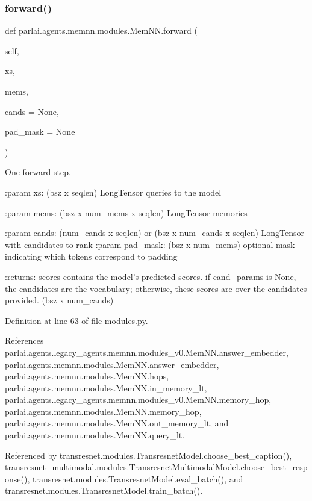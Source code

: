 \subsubsection{\texorpdfstring{forward()}{forward()}}
{\footnotesize\ttfamily def parlai.\+agents.\+memnn.\+modules.\+Mem\+N\+N.\+forward (\begin{DoxyParamCaption}\item[{}]{self,  }\item[{}]{xs,  }\item[{}]{mems,  }\item[{}]{cands = {\ttfamily None},  }\item[{}]{pad\+\_\+mask = {\ttfamily None} }\end{DoxyParamCaption})}

\begin{DoxyVerb}One forward step.

:param xs:
    (bsz x seqlen) LongTensor queries to the model

:param mems:
    (bsz x num_mems x seqlen) LongTensor memories

:param cands:
    (num_cands x seqlen) or (bsz x num_cands x seqlen)
    LongTensor with candidates to rank
:param pad_mask:
    (bsz x num_mems) optional mask indicating which tokens
    correspond to padding

:returns:
    scores contains the model's predicted scores.
    if cand_params is None, the candidates are the vocabulary;
    otherwise, these scores are over the candidates provided.
    (bsz x num_cands)
\end{DoxyVerb}
 

Definition at line 63 of file modules.\+py.



References parlai.\+agents.\+legacy\+\_\+agents.\+memnn.\+modules\+\_\+v0.\+Mem\+N\+N.\+answer\+\_\+embedder, parlai.\+agents.\+memnn.\+modules.\+Mem\+N\+N.\+answer\+\_\+embedder, parlai.\+agents.\+memnn.\+modules.\+Mem\+N\+N.\+hops, parlai.\+agents.\+memnn.\+modules.\+Mem\+N\+N.\+in\+\_\+memory\+\_\+lt, parlai.\+agents.\+legacy\+\_\+agents.\+memnn.\+modules\+\_\+v0.\+Mem\+N\+N.\+memory\+\_\+hop, parlai.\+agents.\+memnn.\+modules.\+Mem\+N\+N.\+memory\+\_\+hop, parlai.\+agents.\+memnn.\+modules.\+Mem\+N\+N.\+out\+\_\+memory\+\_\+lt, and parlai.\+agents.\+memnn.\+modules.\+Mem\+N\+N.\+query\+\_\+lt.



Referenced by transresnet.\+modules.\+Transresnet\+Model.\+choose\+\_\+best\+\_\+caption(), transresnet\+\_\+multimodal.\+modules.\+Transresnet\+Multimodal\+Model.\+choose\+\_\+best\+\_\+response(), transresnet.\+modules.\+Transresnet\+Model.\+eval\+\_\+batch(), and transresnet.\+modules.\+Transresnet\+Model.\+train\+\_\+batch().

